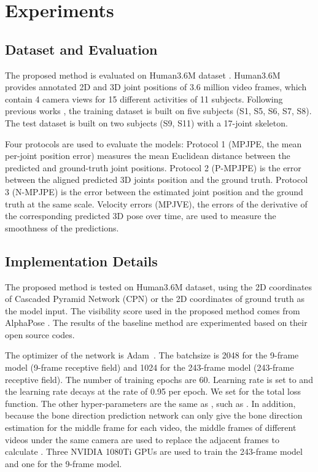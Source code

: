 \documentclass[journal]{IEEEtran}
\begin{document}
\section{Experiments}
\subsection{Dataset and Evaluation}
The proposed method is evaluated on Human3.6M dataset \cite{Catalin2014Human3}. Human3.6M provides annotated 2D and 3D joint positions of 3.6 million video frames, which contain 4 camera views for 15 different activities of 11 subjects. Following previous works  \cite{2018Propagating,hossain2018exploiting,20183D}, the training dataset is built on five subjects (S1, S5, S6, S7, S8). The test dataset is built on two subjects (S9, S11) with a 17-joint skeleton.

Four protocols are used to evaluate the models: Protocol 1 (MPJPE, the mean per-joint position error) measures the mean Euclidean distance between the predicted and ground-truth joint positions. Protocol 2 (P-MPJPE) is the error between the aligned predicted 3D joints position and the ground truth. Protocol 3 (N-MPJPE) is the error between the estimated joint position and the ground truth at the same scale. Velocity errors (MPJVE), the errors of the derivative of the corresponding predicted 3D pose over time, are used to measure the smoothness of the predictions.

\subsection{Implementation Details}
\label{suction:parameters}
The proposed method is tested on Human3.6M dataset, using the 2D coordinates of Cascaded Pyramid Network  \cite{20183D} (CPN) or the 2D coordinates of ground truth as the model input. The visibility score used in the proposed method comes from AlphaPose \cite{fang2017rmpe}. The results of the baseline method \cite{2020Anatomy} are experimented based on their open source codes.

The optimizer of the network is Adam~\cite{kingma2014adam}. {The batchsize  is 2048 for the 9-frame model (9-frame receptive field) and 1024 for the 243-frame model (243-frame receptive field). The  number of training epochs are 60. Learning rate is set to  and the learning rate decays at the rate of 0.95 per epoch.} We set  for the total loss function. The other hyper-parameters are the same as \cite{2020Anatomy}, such as . In addition, because the bone direction prediction network can only give the bone direction estimation for the middle frame for each video, the middle frames of different videos under the same camera are used to replace the adjacent frames to calculate .
Three NVIDIA 1080Ti GPUs are used to train the 243-frame model and one for the 9-frame model. 
\end{document}
